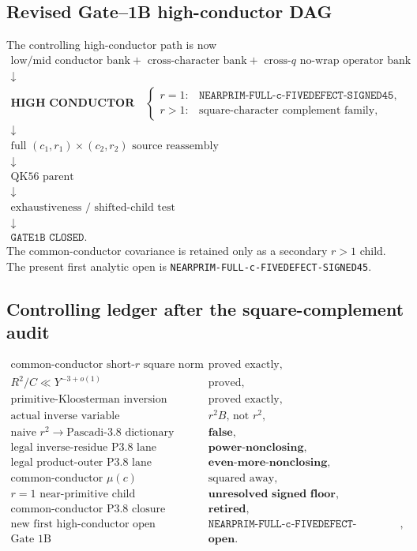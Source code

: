\documentclass[11pt]{article}
\theoremstyle{definition}
\newcommand{\1}{\mathbf 1}
\begin{document}
\subsection{Revised Gate--1B high-conductor DAG}

The controlling high-conductor path is now
\[
\boxed{
\begin{array}{c}
\text{low/mid conductor bank}
+\text{ cross-character bank}
+\text{ cross-$q$ no-wrap operator bank}
\\[1mm]\downarrow\\[-1mm]
\textbf{HIGH CONDUCTOR}
\quad
\begin{cases}
 r=1:&\boxed{\texttt{NEARPRIM-FULL-c-FIVEDEFECT-SIGNED45}},\\
 r>1:&\text{square-character complement family},
\end{cases}
\\[2mm]\downarrow\\
\text{full }(c_1,r_1)\times(c_2,r_2)\text{ source reassembly}
\\\downarrow\\
\text{QK56 parent}
\\\downarrow\\
\text{exhaustiveness / shifted-child test}
\\\downarrow\\
\texttt{GATE1B CLOSED}.
\end{array}}
\]
The common-conductor covariance is retained only as a secondary $r>1$ child.
The present first analytic open is
\texttt{NEARPRIM-FULL-c-FIVEDEFECT-SIGNED45}.

\subsection{Controlling ledger after the square-complement audit}

\[
\begin{array}{ll}
\text{common-conductor short-$r$ square norm} & \text{proved exactly},\\
R^2/C\ll Y^{-3+o(1)} & \text{proved},\\
\text{primitive-Kloosterman inversion} & \text{proved exactly},\\
\text{actual inverse variable} & r^2B\text{, not }r^2,\\
\text{naive }r^2\to\text{Pascadi-3.8 dictionary} & \textbf{false},\\
\text{legal inverse-residue P3.8 lane} & \textbf{power-nonclosing},\\
\text{legal product-outer P3.8 lane} & \textbf{even-more-nonclosing},\\
\text{common-conductor }\mu(c) & \text{squared away},\\
r=1\text{ near-primitive child} & \textbf{unresolved signed floor},\\
\text{common-conductor P3.8 closure} & \textbf{retired},\\
\text{new first high-conductor open} & \boxed{\texttt{NEARPRIM-FULL-c-FIVEDEFECT-SIGNED45}},\\
\text{Gate 1B} & \textbf{open}.
\end{array}
\]
\end{document}
